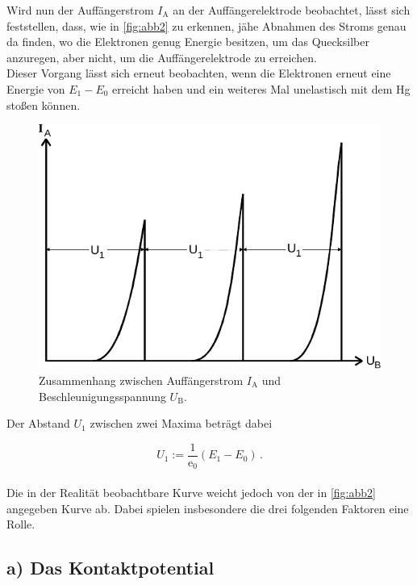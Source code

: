 Wird nun der Auffängerstrom $I_\text{A}$ an der Auffängerelektrode
beobachtet, lässt sich feststellen, dass, wie in \autoref{fig:abb2} zu erkennen,
jähe Abnahmen des Stroms genau da finden, wo die Elektronen genug Energie besitzen,
um das Quecksilber anzuregen, aber nicht, um die Auffängerelektrode zu erreichen. \\

Dieser Vorgang lässt sich erneut beobachten, wenn die Elektronen erneut
eine Energie von $E_1 - E_0$ erreicht haben und ein weiteres Mal unelastisch mit
dem Hg stoßen können.

\begin{figure}[H]
    \centering
    \includegraphics{figures/Abb_2.pdf}
    \caption{Zusammenhang zwischen Auffängerstrom $I_\text{A}$ und Beschleunigungsspannung $U_\text{B}$\cite{ap08}.}
    \label{fig:abb2}
\end{figure}

Der Abstand $U_1$ zwischen zwei Maxima beträgt dabei

\begin{equation}
    U_1 := \frac{1}{\text{e}_0} (E_1 - E_0) \,.
\end{equation} \\

Die in der Realität beobachtbare Kurve weicht jedoch von der in \autoref{fig:abb2} angegeben Kurve ab.
Dabei spielen insbesondere die drei folgenden Faktoren eine Rolle.

\subsection*{a) Das Kontaktpotential}

